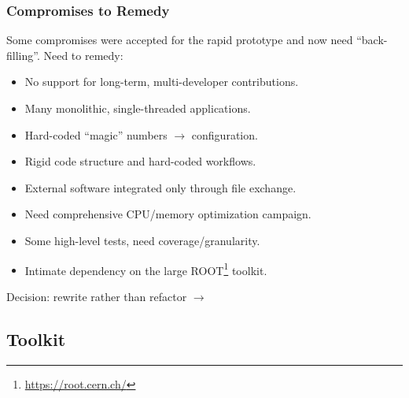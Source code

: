 \documentclass[xcolor=dvipsnames]{beamer}
\begin{document}
\begin{frame}
  \frametitle{Compromises to Remedy}

  Some compromises were accepted for the rapid prototype and now need
  ``back-filling''.  Need to remedy:

  \begin{itemize}
  \item No support for long-term, multi-developer contributions.
  \item Many monolithic, single-threaded applications.
  \item Hard-coded ``magic'' numbers $\to$ configuration.
  \item Rigid code structure and hard-coded workflows.
  \item External software integrated only through file exchange.
  \item Need comprehensive CPU/memory optimization campaign.
  \item Some high-level tests, need coverage/granularity.
  \item Intimate dependency on the large
    ROOT\footnote{\url{https://root.cern.ch/}} toolkit.
  \end{itemize}

  Decision: rewrite rather than refactor $\longrightarrow$
  
\end{frame}

\subsection{Toolkit}
\end{document}
